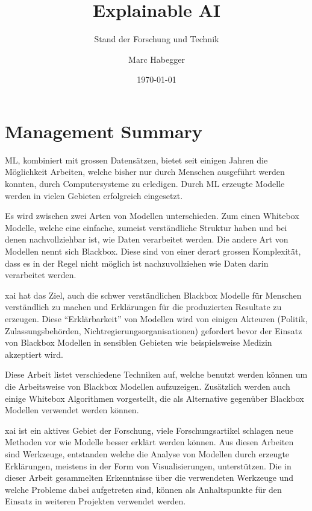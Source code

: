 \documentclass[
  12pt, %
  a4paper, %
  oneside, %
  openany, 
  numbers=noenddot, %
  BCOR=5mm, %
  parskip=half*, %
  thesis, %
]{bfhbook}
\author{Marc Habegger}
\title{Explainable AI}
\subtitle{Stand der Forschung und Technik}
\date{\today} %
\begin{document}
                         
\maketitle

\tableofcontents
\sloppy
\mainmatter %

\RaggedRight

\chapter{Management Summary}
\Gls{ML}, kombiniert mit grossen Datensätzen, bietet seit einigen Jahren die Möglichkeit Arbeiten, welche bisher nur durch Menschen ausgeführt werden konnten, durch Computersysteme zu erledigen. Durch \Gls{ML} erzeugte Modelle werden in vielen Gebieten erfolgreich eingesetzt. 

Es wird zwischen zwei Arten von Modellen unterschieden. Zum einen Whitebox Modelle, welche eine einfache, zumeist verständliche Struktur haben und bei denen nachvollziehbar ist, wie Daten verarbeitet werden. Die andere Art von Modellen nennt sich Blackbox. Diese sind von einer derart grossen Komplexität, dass es in der Regel nicht möglich ist nachzuvollziehen wie Daten darin verarbeitet werden. 

\Gls{xai} hat das Ziel, auch die schwer verständlichen Blackbox Modelle für Menschen verständlich zu machen und Erklärungen für die produzierten Resultate zu erzeugen. Diese ``Erklärbarkeit'' von Modellen wird von einigen Akteuren (Politik, Zulassungsbehörden, Nichtregierungsorganisationen) gefordert bevor der Einsatz von Blackbox Modellen in sensiblen Gebieten wie beispielsweise Medizin akzeptiert wird. 

Diese Arbeit listet verschiedene Techniken auf, welche benutzt werden können um die Arbeitsweise von Blackbox Modellen aufzuzeigen.
Zusätzlich werden auch einige Whitebox Algorithmen vorgestellt, die als Alternative gegenüber Blackbox Modellen verwendet werden können.

\Gls{xai} ist ein aktives Gebiet der Forschung, viele Forschungsartikel schlagen neue Methoden vor wie Modelle besser erklärt werden können. Aus diesen Arbeiten sind Werkzeuge, entstanden welche die Analyse von Modellen durch erzeugte Erklärungen, meistens in der Form von Visualisierungen, unterstützen. Die in dieser Arbeit gesammelten Erkenntnisse über die verwendeten Werkzeuge und welche Probleme dabei aufgetreten sind, können als Anhaltspunkte für den Einsatz in weiteren Projekten verwendet werden.
\end{document}
